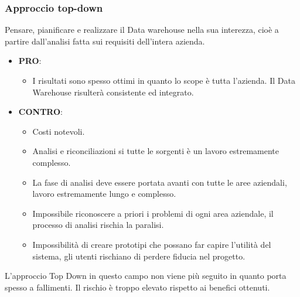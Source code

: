 \subsubsection{Approccio top-down}
Pensare, pianificare e realizzare il Data warehouse nella sua interezza, cioè a partire dall'analisi fatta sui requisiti dell'intera azienda.
\begin{itemize}
	\item \textbf{PRO}:
	\begin{itemize}
		\item I risultati sono spesso ottimi in quanto lo scope è tutta l'azienda. Il Data Warehouse risulterà consistente ed integrato.
	\end{itemize}
	\item \textbf{CONTRO}:
	\begin{itemize}
		\item Costi notevoli.
		\item Analisi e riconciliazioni si tutte le sorgenti è un lavoro estremamente complesso.
		\item La fase di analisi deve essere portata avanti con tutte le aree aziendali, lavoro estremamente lungo e complesso.
		\item Impossibile riconoscere a priori i problemi di ogni area aziendale, il processo di analisi rischia la paralisi.
		\item Impossibilità di creare prototipi che possano far capire l'utilità del sistema, gli utenti rischiano di perdere fiducia nel progetto.
	\end{itemize}
\end{itemize}
\noindent L'approccio Top Down in questo campo non viene più seguito in quanto porta spesso a fallimenti. Il rischio è troppo elevato rispetto ai benefici ottenuti.
